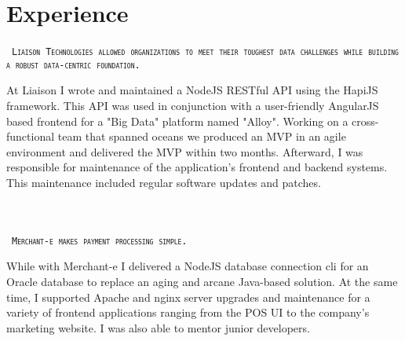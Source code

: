 \documentclass{muratcan_cv}
\begin{document}
\section{Experience}
    \mbox { \scshape \hspace{1.2em} \tiny{\texttt{Liaison Technologies allowed organizations
     to meet their toughest data challenges while building a robust data-centric foundation.}}}\\
    \indent \indent \begin{minipage}{0.96\linewidth} \footnotesize
     At Liaison I wrote and maintained a NodeJS RESTful API using the HapiJS framework. This API was used in conjunction with a user-friendly AngularJS based frontend for a "Big Data" platform named "Alloy". Working on a cross-functional team that spanned oceans we produced an MVP in an agile environment and delivered the MVP within two months. Afterward, I was responsible for maintenance of the application's frontend and backend systems. This maintenance included regular software updates and patches.
    \end{minipage} \\[0.1cm]\\
    \mbox { \scshape \hspace{1.2em} \tiny{\texttt{Merchant-e makes payment processing simple.}}}\\
    \indent \indent \begin{minipage}{0.96\linewidth} \footnotesize
     While with Merchant-e I delivered a NodeJS database connection cli for an Oracle database to replace an aging and arcane Java-based solution. At the same time, I supported Apache and nginx server upgrades and maintenance for a variety of frontend applications ranging from the POS UI to the company's marketing website. I was also able to mentor junior developers.
    \end{minipage} \\[0.1cm]\\
\end{document}
